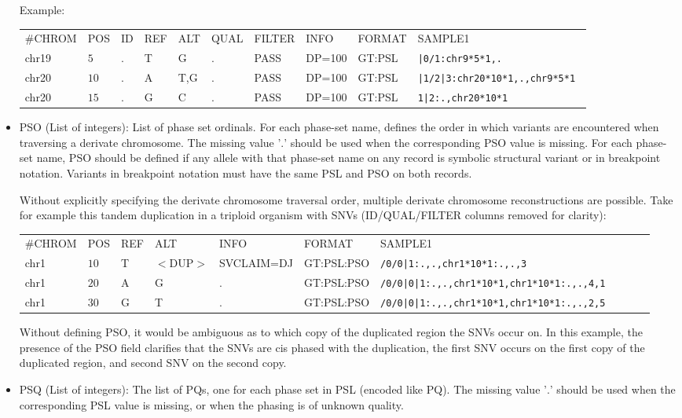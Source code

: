 \documentclass[8pt]{article}
\begin{document}
\begin{itemize}
  Example:
  
  \vspace{0.5em}
  \begin{tabular}{ l l l l l l l l l l}
    \#CHROM & POS & ID & REF & ALT & QUAL & FILTER & INFO & FORMAT & SAMPLE1\\
     chr19 & $5$ & . & T & G & . & PASS & DP=100 &GT:PSL & \tt{|0/1:chr9*5*1,.}\\
    chr20 & $10$ & . & A & T,G & . & PASS & DP=100 &GT:PSL & \tt{|1/2|3:chr20*10*1,.,chr9*5*1} \\
    chr20 & $15$ & . & G & C & . & PASS & DP=100 &GT:PSL & \tt{1|2:.,chr20*10*1}\\
  \end{tabular}
  
  \item PSO (List of integers): List of phase set ordinals.
  For each phase-set name, defines the order in which variants are encountered when traversing a derivate chromosome.
  The missing value '$.$' should be used when the corresponding PSO value is missing.
  For each phase-set name, PSO should be defined if any allele with that phase-set name on any record is symbolic structural variant or in breakpoint notation.
  Variants in breakpoint notation must have the same PSL and PSO on both records.
  
  Without explicitly specifying the derivate chromosome traversal order, multiple derivate chromosome reconstructions are possible.
  Take for example this tandem duplication in a triploid organism with SNVs (ID/QUAL/FILTER columns removed for clarity):
  
  \vspace{0.5em}
  \begin{tabular}{ l l l l l l l l l l}
  \#CHROM & POS & REF & ALT & INFO & FORMAT & SAMPLE1\\
    chr1 & $10$ & T & $<$DUP$>$ & SVCLAIM=DJ & GT:PSL:PSO & \tt{/0/0|1:.,.,chr1*10*1:.,.,3}\\
    chr1 & $20$ & A & G & . & GT:PSL:PSO & \tt{/0/0|0|1:.,.,chr1*10*1,chr1*10*1:.,.,4,1} \\
    chr1 & $30$ & G & T & . & GT:PSL:PSO & \tt{/0/0|0|1:.,.,chr1*10*1,chr1*10*1:.,.,2,5} \\
  \end{tabular}
  
  Without defining PSO, it would be ambiguous as to which copy of the duplicated region the SNVs occur on.
  In this example, the presence of the PSO field clarifies that the SNVs are cis phased with the duplication, the first SNV occurs on the first copy of the duplicated region, and second SNV on the second copy.
  
  \item PSQ (List of integers): The list of PQs, one for each phase set in PSL (encoded like PQ). 
  The missing value '$.$' should be used when the corresponding PSL value is missing, or when the phasing is of unknown quality.
\end{itemize}
\end{document}
